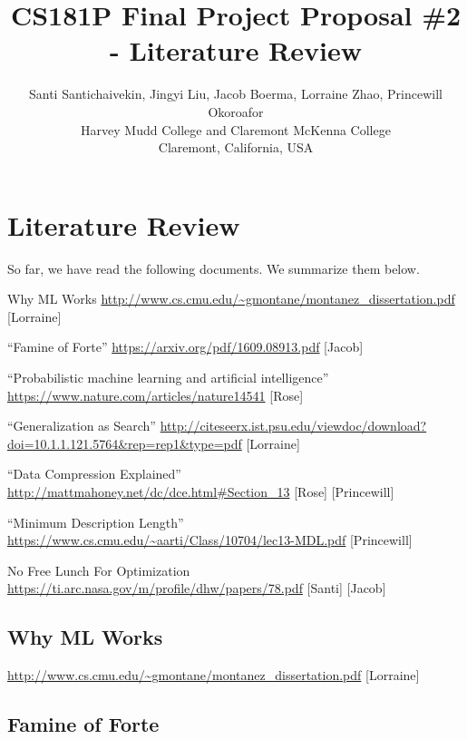 \documentclass[12pt]{article}
\begin{document}
\title{CS181P Final Project Proposal \#2 - Literature Review}

\author{
Santi Santichaivekin, Jingyi Liu, Jacob Boerma, Lorraine Zhao, Princewill Okoroafor\\
Harvey Mudd College and Claremont McKenna College\\
Claremont, California, USA\\
}

\maketitle

\section{Literature Review}

So far, we have read the following documents. We summarize them below.

\bigskip

Why ML Works
\url{http://www.cs.cmu.edu/~gmontane/montanez_dissertation.pdf} [Lorraine]

“Famine of Forte”
\url{https://arxiv.org/pdf/1609.08913.pdf} [Jacob]

“Probabilistic machine learning and artificial intelligence”
\url{https://www.nature.com/articles/nature14541} [Rose]

“Generalization as Search”
\url{http://citeseerx.ist.psu.edu/viewdoc/download?doi=10.1.1.121.5764&rep=rep1&type=pdf} [Lorraine]

“Data Compression Explained” 
\url{http://mattmahoney.net/dc/dce.html#Section_13} [Rose] [Princewill]

“Minimum Description Length” 
\url{https://www.cs.cmu.edu/~aarti/Class/10704/lec13-MDL.pdf} [Princewill]

No Free Lunch For Optimization
\url{https://ti.arc.nasa.gov/m/profile/dhw/papers/78.pdf} [Santi] [Jacob]	

\newpage

\subsection*{Why ML Works} 

\url{http://www.cs.cmu.edu/~gmontane/montanez_dissertation.pdf} [Lorraine]

\newpage


\subsection*{Famine of Forte} 
\end{document}
